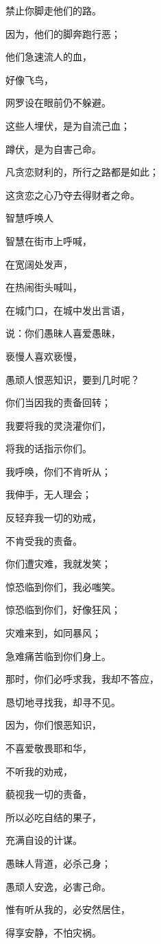 {\par }{\Q 禁止你脚走他们的路。
\par }{\Q {}因为，他们的脚奔跑行恶；
\par }{\Q 他们急速流人的血，
\par }{\Q {}好像飞鸟，
\par }{\Q 网罗设在眼前仍不躲避。
\par }{\Q {}这些人埋伏，是为自流己血；
\par }{\Q 蹲伏，是为自害己命。
\par }{\Q {}凡贪恋财利的，所行之路都是如此；
\par }{\Q 这贪恋之心乃夺去得财者之命。
\par }{\SH 智慧呼唤人
\par }{\Q {}智慧在街市上呼喊，
\par }{\Q 在宽阔处发声，
\par }{\Q {}在热闹街头喊叫，
\par }{\Q 在城门口，在城中发出言语，
\par }{\Q {}说：你们愚昧人喜爱愚昧，
\par }{\Q 亵慢人喜欢亵慢，
\par }{\Q 愚顽人恨恶知识，要到几时呢？
\par }{\Q {}你们当因我的责备回转；
\par }{\Q 我要将我的灵浇灌你们，
\par }{\Q 将我的话指示你们。
\par }{\Q {}我呼唤，你们不肯听从；
\par }{\Q 我伸手，无人理会；
\par }{\Q {}反轻弃我一切的劝戒，
\par }{\Q 不肯受我的责备。
\par }{\Q {}你们遭灾难，我就发笑；
\par }{\Q 惊恐临到你们，我必嗤笑。
\par }{\Q {}惊恐临到你们，好像狂风；
\par }{\Q 灾难来到，如同暴风；
\par }{\Q 急难痛苦临到你们身上。
\par }{\Q {}那时，你们必呼求我，我却不答应，
\par }{\Q 恳切地寻找我，却寻不见。
\par }{\Q {}因为，你们恨恶知识，
\par }{\Q 不喜爱敬畏耶和华，
\par }{\Q {}不听我的劝戒，
\par }{\Q 藐视我一切的责备，
\par }{\Q {}所以必吃自结的果子，
\par }{\Q 充满自设的计谋。
\par }{\Q {}愚昧人背道，必杀己身；
\par }{\Q 愚顽人安逸，必害己命。
\par }{\Q {}惟有听从我的，必安然居住，
\par }{\Q 得享安静，不怕灾祸。

}
